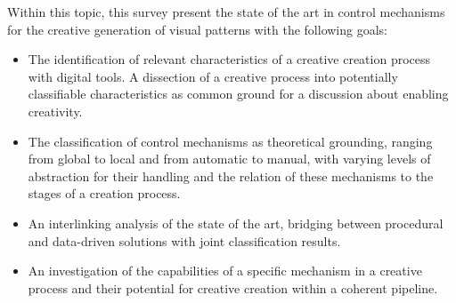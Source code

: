 Within this topic, this survey present the state of the art in control mechanisms for the creative generation of visual patterns with the following goals:


\begin{itemize}
    \item The identification of relevant characteristics of a creative creation process with digital tools. A dissection of a creative process into potentially classifiable characteristics as common ground for a discussion about enabling creativity.
    \item The classification of control mechanisms as theoretical grounding, ranging from global to local and from automatic to manual, with varying levels of abstraction for their handling and the relation of these mechanisms to the stages of a creation process. 
    \item An interlinking analysis of the state of the art, bridging between procedural and data-driven solutions with joint classification results. 
    \item An investigation of the capabilities of a specific mechanism in a creative process and their potential for creative creation within a coherent pipeline.
\end{itemize}
